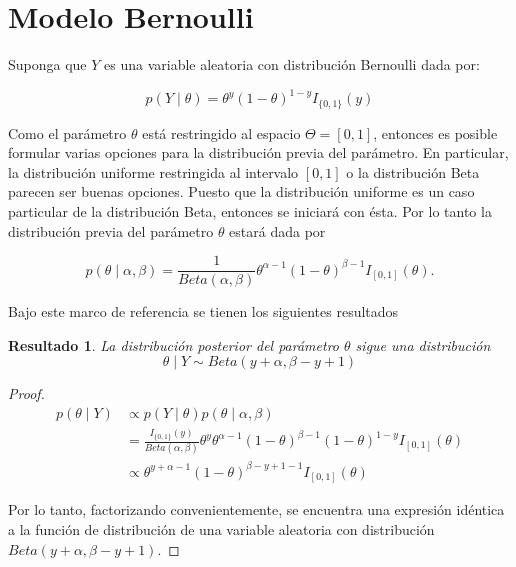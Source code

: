 \documentclass[
  10pt,
  spanish,
]{book}
\newtheorem{proposition}{Resultado}[chapter]
\theoremstyle{definition}
\theoremstyle{definition}
\theoremstyle{definition}
\theoremstyle{definition}
\theoremstyle{remark}
\begin{document}
\hypertarget{modelo-bernoulli}{%
\section{Modelo Bernoulli}\label{modelo-bernoulli}}

Suponga que \(Y\) es una variable aleatoria con distribución Bernoulli
dada por:

\begin{equation}
p(Y \mid \theta)=\theta^y(1-\theta)^{1-y}I_{\{0,1\}}(y)
\end{equation}

Como el parámetro \(\theta\) está restringido al espacio \(\Theta=[0,1]\),
entonces es posible formular varias opciones para la distribución previa
del parámetro. En particular, la distribución uniforme restringida al
intervalo \([0,1]\) o la distribución Beta parecen ser buenas opciones.
Puesto que la distribución uniforme es un caso particular de la
distribución Beta, entonces se iniciará con ésta. Por lo tanto la
distribución previa del parámetro \(\theta\) estará dada por

\begin{equation}
\label{eq:betadistribution}
p(\theta \mid \alpha,\beta)=
\frac{1}{Beta(\alpha,\beta)}\theta^{\alpha-1}(1-\theta)^{\beta-1}I_{[0,1]}(\theta).
\end{equation}

Bajo este marco de referencia se tienen los siguientes resultados

\begin{proposition}
\protect\hypertarget{prp:unnamed-chunk-1}{}{\label{prp:unnamed-chunk-1} }La distribución posterior del parámetro \(\theta\) sigue una distribución
\begin{equation*}
\theta \mid Y \sim Beta(y+\alpha,\beta-y+1)
\end{equation*}
\end{proposition}

\begin{proof}
{}\begin{align*}
p(\theta \mid Y)&\propto 
p(Y \mid \theta)p(\theta \mid \alpha,\beta)\\
&=\frac{I_{\{0,1\}}(y)}{Beta(\alpha,\beta)}\theta^y\theta^{\alpha-1}(1-\theta)^{\beta-1}(1-\theta)^{1-y}I_{[0,1]}(\theta)\\
&\propto \theta^{y+\alpha-1}(1-\theta)^{\beta-y+1-1}I_{[0,1]}(\theta)
\end{align*}

Por lo tanto, factorizando convenientemente, se encuentra una expresión idéntica a la función de distribución de una variable aleatoria con distribución \(Beta(y+\alpha,\beta-y+1)\).
\end{proof}
\end{document}
